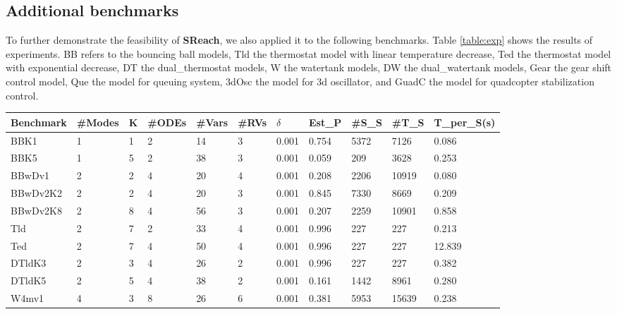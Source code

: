 \subsection{Additional benchmarks}
To further demonstrate the feasibility of {\bf SReach}, we also applied it to the following benchmarks. Table \ref{table:exp} shows the results of experiments. BB refers to the bouncing ball models, Tld the thermostat model with linear temperature decrease, Ted the thermostat model with exponential decrease, DT the dual\_thermostat models, W the watertank models, DW the dual\_watertank models, Gear the gear shift control model, Que the model for queuing system, 3dOsc the model for 3d oscillator, and GuadC the model for quadcopter stabilization control. 
\begin{table}[h]
\centering
    \begin{tabular}{|l|l|l|l|l|l|l|l|l|l|l|}
    \hline
    Benchmark & \#Modes & K & \#ODEs & \#Vars & \#RVs & $\delta$ & Est\_P & \#S\_S & \#T\_S & T\_per\_S(s) \\ \hline
    BBK1      & 1       & 1 & 2      & 14    & 3     & 0.001 & 0.754  & 5372      & 7126     & 0.086           \\ \hline
    BBK5      & 1       & 5 & 2      & 38    & 3     & 0.001 & 0.059  & 209       & 3628     & 0.253           \\ \hline
    BBwDv1    & 2       & 2 & 4      & 20    & 4     & 0.001 & 0.208  & 2206      & 10919    & 0.080           \\ \hline
    BBwDv2K2  & 2       & 2 & 4      & 20    & 3     & 0.001 & 0.845  & 7330      & 8669     & 0.209           \\ \hline
    BBwDv2K8  & 2       & 8 & 4      & 56    & 3     & 0.001 & 0.207  & 2259      & 10901    & 0.858           \\ \hline
    Tld       & 2       & 7 & 2      & 33     & 4     & 0.001 & 0.996      & 227         & 227        & 0.213               \\ \hline
    Ted       & 2       & 7 & 4      & 50     & 4     & 0.001 & 0.996      & 227         & 227       & 12.839               \\ \hline
    DTldK3    & 2       & 3 & 4      & 26    & 2     & 0.001 & 0.996  & 227       & 227      & 0.382           \\ \hline
    DTldK5    & 2       & 5 & 4      & 38    & 2     & 0.001 & 0.161  & 1442      & 8961     & 0.280           \\ \hline
    W4mv1       & 4       & 3 & 8      & 26     & 6     & 0.001 & 0.381      & 5953         & 15639        & 0.238         \\ \hline

\end{tabular}
\end{table}

